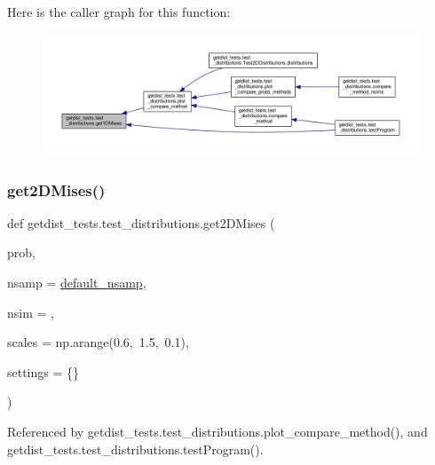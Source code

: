 Here is the caller graph for this function\+:
\nopagebreak
\begin{figure}[H]
\begin{center}
\leavevmode
\includegraphics[width=350pt]{namespacegetdist__tests_1_1test__distributions_a023a4d63a4ed9241e54b23f96f3dd9c2_icgraph}
\end{center}
\end{figure}
\mbox{\label{namespacegetdist__tests_1_1test__distributions_a33e553d1690409e6be303cd912648ec5}} 
\subsubsection{\texorpdfstring{get2\+D\+Mises()}{get2DMises()}}
{\footnotesize\ttfamily def getdist\+\_\+tests.\+test\+\_\+distributions.\+get2\+D\+Mises (\begin{DoxyParamCaption}\item[{}]{prob,  }\item[{}]{nsamp = {\ttfamily \mbox{\hyperlink{namespacegetdist__tests_1_1test__distributions_af66b4064706bf88e0ed5378ff868fc39}{default\+\_\+nsamp}}},  }\item[{}]{nsim = {},  }\item[{}]{scales = {\ttfamily np.arange(0.6,~1.5,~0.1)},  }\item[{}]{settings = {\ttfamily \{\}} }\end{DoxyParamCaption})}



Referenced by getdist\+\_\+tests.\+test\+\_\+distributions.\+plot\+\_\+compare\+\_\+method(), and getdist\+\_\+tests.\+test\+\_\+distributions.\+test\+Program().

